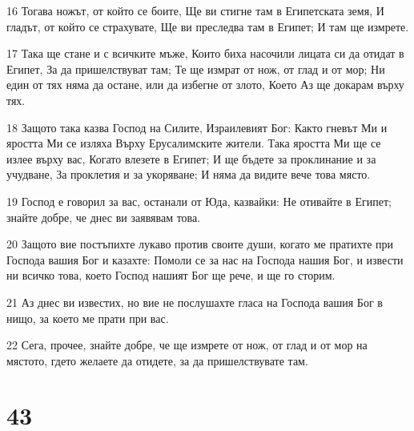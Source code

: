 \par 16 Тогава ножът, от който се боите, Ще ви стигне там в Египетската земя, И гладът, от който се страхувате, Ще ви преследва там в Египет; И там ще измрете.
\par 17 Така ще стане и с всичките мъже, Които биха насочили лицата си да отидат в Египет, За да пришелствуват там; Те ще измрат от нож, от глад и от мор; Ни един от тях няма да остане, или да избегне от злото, Което Аз ще докарам върху тях.
\par 18 Защото така казва Господ на Силите, Израилевият Бог: Както гневът Ми и яростта Ми се изляха Върху Ерусалимските жители. Така яростта Ми ще се излее върху вас, Когато влезете в Египет; И ще бъдете за проклинание и за учудване, За проклетия и за укоряване; И няма да видите вече това място.
\par 19 Господ е говорил за вас, останали от Юда, казвайки: Не отивайте в Египет; знайте добре, че днес ви заявявам това.
\par 20 Защото вие постъпихте лукаво против своите души, когато ме пратихте при Господа вашия Бог и казахте: Помоли се за нас на Господа нашия Бог, и извести ни всичко това, което Господ нашият Бог ще рече, и ще го сторим.
\par 21 Аз днес ви известих, но вие не послушахте гласа на Господа вашия Бог в нищо, за което ме прати при вас.
\par 22 Сега, прочее, знайте добре, че ще измрете от нож, от глад и от мор на мястото, гдето желаете да отидете, за да пришелствувате там.

\chapter{43}

